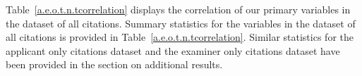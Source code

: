 \documentclass[12pt,letterpaper]{article}
\begin{document}


Table~\ref{a.e.o.t.n.tcorrelation} displays the correlation of our primary variables in the dataset of  all citations. Summary statistics for the variables in the dataset of all citations is provided in Table~\ref{a.e.o.t.n.tcorrelation}. Similar statistics for the applicant only citations dataset and the examiner only citations dataset have been provided in the section on additional results.


%


%
%



\end{document}
